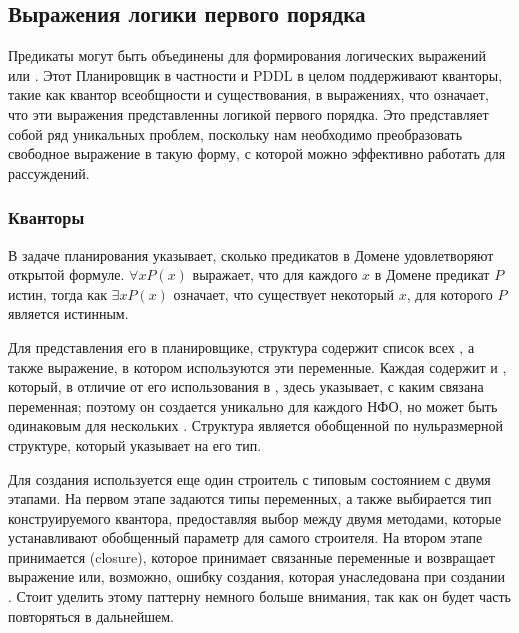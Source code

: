 \subsection{Выражения логики первого порядка}

Предикаты могут быть объединены для формирования логических выражений или .
Этот Планировщик в частности и PDDL в целом поддерживают кванторы, такие как
квантор всеобщности и существования, в выражениях,
что означает, что эти выражения представленны логикой первого порядка.
Это представляет собой ряд уникальных проблем,
поскольку нам необходимо преобразовать свободное выражение
в такую форму, с которой можно эффективно работать для рассуждений.

\subsubsection{Кванторы}

В задаче планирования  указывает,
сколько предикатов в Домене удовлетворяют открытой формуле.
 $\forall x P(x)$ выражает,
что для каждого $x$ в Домене предикат $P$ истин,
тогда как  $\exists x P(x)$ означает,
что существует некоторый $x$, для которого $P$ является истинным.

Для представления его в планировщике,
структура  содержит список всех ,
а также выражение, в котором используются эти переменные.
Каждая  содержит  и ,
который, в отличие от его использования в ,
здесь указывает, с каким  связана переменная;
поэтому он создается уникально для каждого НФО,
но может быть одинаковым для нескольких .
Структура  является обобщенной по нульразмерной структуре,
который указывает на его тип.

Для создания  используется еще один строитель с типовым состоянием с двумя этапами.
На первом этапе задаются типы переменных,
а также выбирается тип конструируемого квантора,
предоставляя выбор между двумя методами,
которые устанавливают обобщенный параметр для самого строителя.
На втором этапе принимается  (closure), которое принимает связанные переменные
и возвращает выражение или, возможно, ошибку создания, которая унаследована при создании .
Стоит уделить этому паттерну немного больше внимания, так как он будет часть повторяться в дальнейшем.

